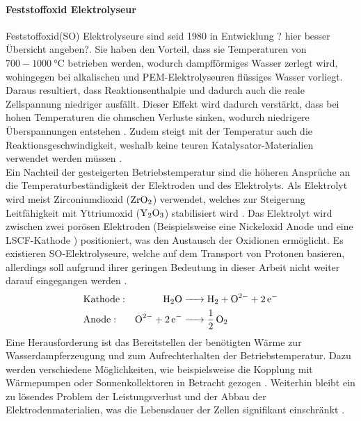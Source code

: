 \paragraph{Feststoffoxid Elektrolyseur}
\label{par:Feststoffoxid Elektrolyseur}
Feststoffoxid(SO) Elektrolyseure sind seid 1980 in Entwicklung \citep{isenberg_energy_1981} ? hier besser Übersicht angeben?. Sie haben  den Vorteil, dass sie Temperaturen von $700-\SI{1000}{\degreeCelsius}$ betrieben werden, wodurch dampfförmiges Wasser zerlegt wird, wohingegen bei alkalischen und PEM-Elektrolyseuren flüssiges Wasser vorliegt. Daraus resultiert, dass Reaktionsenthalpie und dadurch auch die reale Zellspannung niedriger ausfällt. Dieser Effekt wird dadurch verstärkt, dass bei hohen Temperaturen die ohmschen Verluste sinken, wodurch niedrigere Überspannungen entstehen \citep{tremel_electrolysisfundamental_2018}. Zudem steigt mit der Temperatur auch die Reaktionsgeschwindigkeit, weshalb keine teuren Katalysator-Materialien verwendet werden müssen \citep{yan_performance_2017}.\\
Ein Nachteil der gesteigerten Betriebstemperatur sind die höheren Ansprüche an die Temperaturbeständigkeit der Elektroden und des Elektrolyts. Als Elektrolyt wird meist Zirconiumdioxid ($\ce{ZrO2}$) verwendet, welches zur Steigerung Leitfähigkeit mit Yttriumoxid ($\ce{Y2O3}$) stabilisiert wird \citep{butz_decomposition_2009}.
Das Elektrolyt wird zwischen zwei porösen Elektroden (Beispielsweise eine Nickeloxid Anode und eine LSCF-Kathode \citep{schiller_high_2010}) positioniert, was den Austausch der Oxidionen ermöglicht. Es existieren SO-Elektrolyseure, welche auf dem Transport von Protonen basieren, allerdings soll aufgrund ihrer geringen Bedeutung  in dieser Arbeit nicht weiter darauf eingegangen werden \citep{stempien_solid_2013}.
\begin{align}
  \ce{	&{Kathode:} &H2O &-> H2 + O^2- + 2e^-\\
  		&{Anode:} &O^2- + 2 e^-  &->  1/2O2} 
\end{align}
Eine Herausforderung ist das Bereitstellen der benötigten Wärme zur Wasserdampferzeugung und zum Aufrechterhalten der Betriebstemperatur. Dazu werden verschiedene Möglichkeiten, wie beispielsweise die Kopplung mit Wärmepumpen oder Sonnenkollektoren in Betracht gezogen \citep{stempien_solid_2013}. Weiterhin bleibt ein zu lösendes Problem der Leistungsverlust und der Abbau der Elektrodenmaterialien, was die Lebensdauer der Zellen signifikant einschränkt \citep{yan_performance_2017}.

